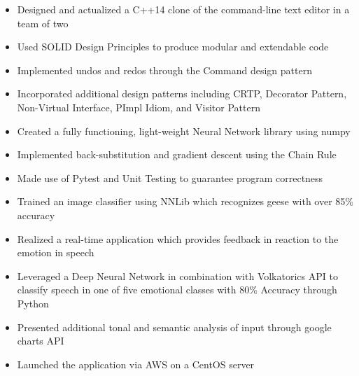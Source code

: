 \documentclass[10pt,a4paper,ragged2e]{altacv}
\begin{document}
\begin{itemize}
    \item Designed and actualized a C++14 clone of the command-line text editor in a team of two
    \item Used SOLID Design Principles to produce modular and extendable code
    \item Implemented undos and redos through the Command design pattern
    \item Incorporated additional design patterns including CRTP, Decorator Pattern, Non-Virtual Interface, PImpl Idiom, and Visitor Pattern
\end{itemize}

\divider

\begin{itemize}
    \item Created a fully functioning, light-weight Neural Network library using numpy
    \item Implemented back-substitution and gradient descent using the Chain Rule
    \item Made use of Pytest and Unit Testing to guarantee program correctness
    \item Trained an image classifier using NNLib which recognizes geese with over 85\% accuracy
\end{itemize}

\divider

\begin{itemize}
   \item Realized a real-time application which provides feedback in reaction to the emotion in speech
   \item Leveraged a Deep Neural Network in combination with Volkatorics API to classify speech in one of five emotional classes with 80\% Accuracy through Python
   \item Presented additional tonal and semantic analysis of input through google charts API
   \item Launched the application via AWS on a CentOS server
\end{itemize}
\end{document}

